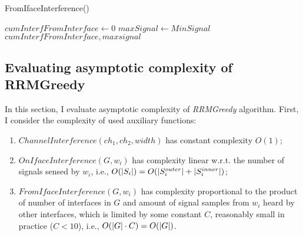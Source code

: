\begin{algorithm}[H]
\caption{FromIfaceInterference()}
\label{rrm:fromifaceinterf}
\DontPrintSemicolon
{}

$cumInterfFromInterface \gets 0$\;
$maxSignal \gets MinSignal$\;
\Return $cumInterfFromInterface, maxsignal$\;
\end{algorithm}

\subsection{Evaluating asymptotic complexity of RRMGreedy}
\label{chapter:research:sec:rrmgreedy:subsec:complexity}
In this section, I evaluate asymptotic complexity of \textit{RRMGreedy} algorithm.
First, I consider the complexity of used auxiliary functions:
\begin{enumerate}
    \item $ChannelInterference(ch_1, ch_2, width)$ has constant complexity $O(1)$;
    \item $OnIfaceInterference(G, w_i)$ has complexity linear w.r.t. the number of signals sensed by $w_i$, i.e.,
        $O(\lvert{S_i}\rvert) = O(\lvert{S^{outer}_i}\rvert + \lvert{S^{inner}_i}\rvert)$;
    \item $FromIfaceInterference(G, w_i)$ has complexity proportional to the product of number of interfaces in $G$ and amount of signal samples from $w_i$ heard by other interfaces, which is limited by some constant $C$, reasonably small in practice ($C < 10$), i.e.,
        $O(\lvert{G}\rvert \cdot C) = O(\lvert{G}\rvert)$.
\end{enumerate}

